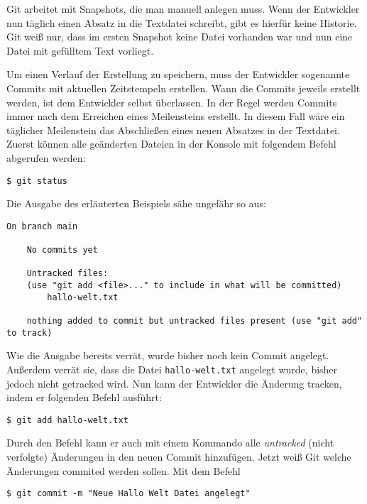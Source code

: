 Git arbeitet mit Snapshots, die man manuell anlegen muss. Wenn der Entwickler
nun täglich einen Absatz in die Textdatei schreibt, gibt es hierfür keine
Historie. Git weiß nur, dass im ersten Snapshot keine Datei vorhanden war und
nun eine Datei mit gefülltem Text vorliegt.

Um einen Verlauf der Erstellung zu speichern, muss der Entwickler sogenannte
Commits mit aktuellen Zeitstempeln erstellen. Wann die Commits jeweils erstellt
werden, ist dem Entwickler selbst überlassen. In der Regel werden Commits immer
nach dem Erreichen eines Meilensteins erstellt. In diesem Fall wäre ein
täglicher Meilenstein das Abschließen eines neuen Absatzes in der Textdatei.
Zuerst können alle geänderten Dateien in der Konsole mit folgendem Befehl
abgerufen werden:

\begin{lstlisting}[style=Bash]
    $ git status
\end{lstlisting}

\newpage
Die Ausgabe des erläuterten Beispiels sähe ungefähr so aus:

\begin{lstlisting}[style=Bash]
    On branch main

    No commits yet

    Untracked files:
    (use "git add <file>..." to include in what will be committed)
        hallo-welt.txt

    nothing added to commit but untracked files present (use "git add" to track)
\end{lstlisting}

Wie die Ausgabe bereits verrät, wurde bisher noch kein Commit angelegt. Außerdem
verrät sie, dass die Datei \texttt{hallo-welt.txt} angelegt wurde, bisher jedoch
nicht getracked wird. Nun kann der Entwickler die Änderung tracken, indem er
folgenden Befehl ausführt:

\begin{lstlisting}[style=Bash]
    $ git add hallo-welt.txt
\end{lstlisting}

Durch den Befehl  kann er auch mit einem Kommando alle
\emph{untracked} (nicht verfolgte) Änderungen in den neuen Commit hinzufügen.
Jetzt weiß Git welche Änderungen commited werden sollen. Mit dem Befehl

\begin{lstlisting}[style=Bash]
    $ git commit -m "Neue Hallo Welt Datei angelegt"
\end{lstlisting}

